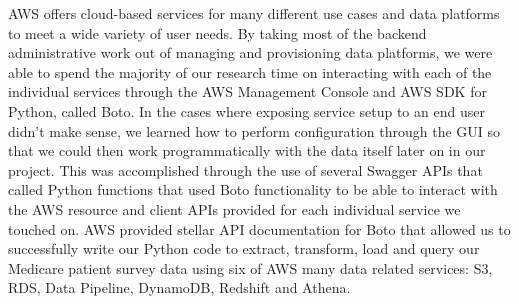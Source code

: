 AWS offers cloud-based services for many different use cases and data platforms to meet a wide variety of user needs. By taking most of the backend administrative work out of managing and provisioning data platforms, we were able to spend the majority of our research time on interacting with each of the individual services through the AWS Management Console and AWS SDK for Python, called Boto. In the cases where exposing service setup to an end user didn't make sense, we learned how to perform configuration through the GUI so that we could then work programmatically with the data itself later on in our project. This was accomplished through the use of several Swagger APIs that called Python functions that used Boto functionality to be able to interact with the AWS resource and client APIs provided for each individual service we touched on. AWS provided stellar API documentation for Boto that allowed us to successfully write our Python code to extract, transform, load and query our Medicare patient survey data using six of AWS many data related services: S3, RDS, Data Pipeline, DynamoDB, Redshift and Athena.    


 

